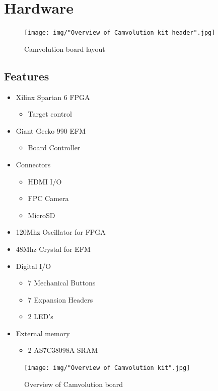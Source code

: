 \section{Hardware}
\begin{figure}
    \texttt{[image: img/"Overview of Camvolution kit header".jpg]}
    \caption{Camvolution board layout}
    \label{fig:board_layout}
\end{figure}

\subsection{Features}
\begin{itemize}
\item Xilinx Spartan 6 FPGA
    \begin{itemize}
    \item Target control
    \end{itemize}
\item Giant Gecko 990 EFM
    \begin{itemize}
    \item Board Controller
    \end{itemize}
\item Connectors
    \begin{itemize}
    \item HDMI I/O
    \item FPC Camera
    \item MicroSD
    \end{itemize}
\item 120Mhz Oscillator for FPGA
\item 48Mhz Crystal for EFM
\item Digital I/O
    \begin{itemize}
    \item 7 Mechanical Buttons
    \item 7 Expansion Headers
    \item 2 LED's
    \end{itemize}
\item External memory
    \begin{itemize}
    \item 2 AS7C38098A SRAM
    \end{itemize}

\end{itemize}


\begin{figure}
    \texttt{[image: img/"Overview of Camvolution kit".jpg]}
    \caption{Overview of Camvolution board}
    \label{fig:board_layout}
\end{figure}

